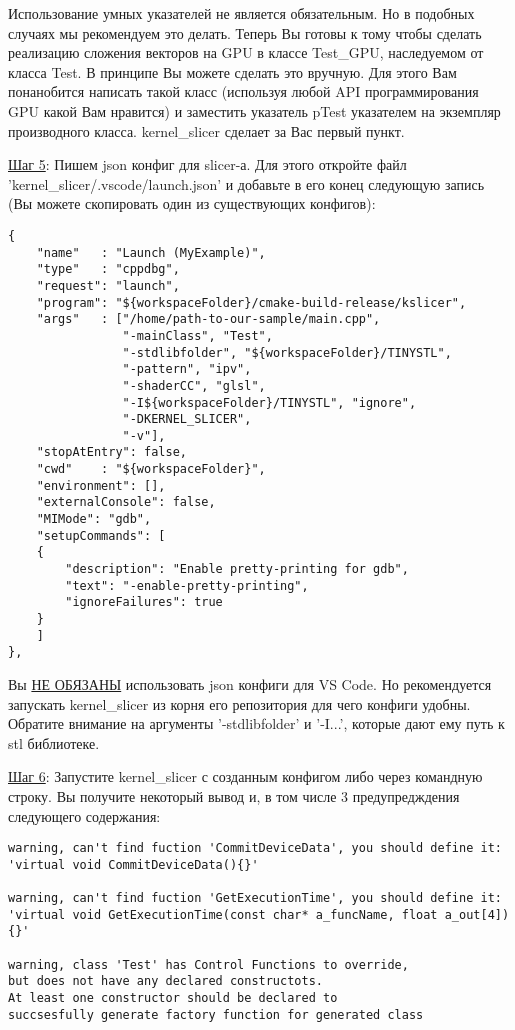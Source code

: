 \documentclass[11pt,fleqn,english,russian]{report} %
\begin{document}
Использование умных указателей не является обязательным. Но в подобных случаях мы рекомендуем это делать. Теперь Вы готовы к тому чтобы сделать реализацию сложения векторов на GPU в классе Test\_GPU, наследуемом от класса Test. В принципе Вы можете сделать это вручную. Для этого Вам понанобится написать такой класс (используя любой API программирования GPU какой Вам нравится) и заместить указатель pTest указателем на экземпляр производного класса. kernel\_slicer сделает за Вас первый пункт.

\vspace*{5px}
\underline{Шаг 5}: Пишем json конфиг для slicer-а. Для этого откройте файл 'kernel\_slicer/.vscode/launch.json' и добавьте в его конец следующую запись (Вы можете скопировать один из существующих конфигов): 

\begin{lstlisting}[caption=конфиг для генерации класса сложения 2 векторов]
{
	"name"   : "Launch (MyExample)",
	"type"   : "cppdbg",
	"request": "launch",
	"program": "${workspaceFolder}/cmake-build-release/kslicer",
	"args"   : ["/home/path-to-our-sample/main.cpp",
	            "-mainClass", "Test", 
	            "-stdlibfolder", "${workspaceFolder}/TINYSTL",
	            "-pattern", "ipv",
	            "-shaderCC", "glsl",
	            "-I${workspaceFolder}/TINYSTL", "ignore",
	            "-DKERNEL_SLICER",
	            "-v"],
	"stopAtEntry": false,
	"cwd"    : "${workspaceFolder}",
	"environment": [],
	"externalConsole": false,
	"MIMode": "gdb",
	"setupCommands": [
	{
		"description": "Enable pretty-printing for gdb",
		"text": "-enable-pretty-printing",
		"ignoreFailures": true
	}
	]
},
\end{lstlisting}\label{lst:my_first_json}

Вы \underline{НЕ ОБЯЗАНЫ} использовать json конфиги для VS Code. Но рекомендуется запускать kernel\_slicer из корня его репозитория для чего конфиги удобны. Обратите внимание на аргументы '-stdlibfolder' и '-I...', которые дают ему путь к stl библиотеке.  


\vspace*{5px}
\underline{Шаг 6}: Запустите kernel\_slicer с созданным конфигом либо через командную строку. Вы получите некоторый вывод и, в том числе 3 предупредждения следующего содержания:

\begin{lstlisting}[caption=конфиг для генерации класса сложения 2 векторов]
warning, can't find fuction 'CommitDeviceData', you should define it: 
'virtual void CommitDeviceData(){}'

warning, can't find fuction 'GetExecutionTime', you should define it: 
'virtual void GetExecutionTime(const char* a_funcName, float a_out[4]){}'

warning, class 'Test' has Control Functions to override, 
but does not have any declared constructots.
At least one constructor should be declared to 
succsesfully generate factory function for generated class
\end{lstlisting}\label{lst:kslicer_warnings}
\end{document}

